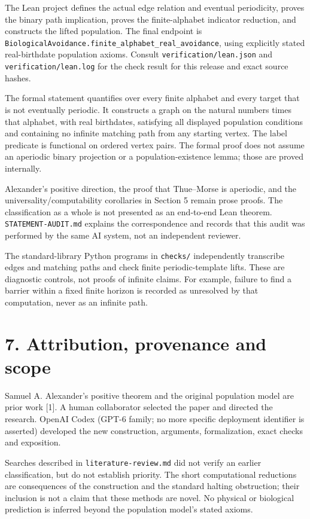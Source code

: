 \documentclass[
  11pt,
]{article}
\begin{document}
The Lean project defines the actual edge relation and eventual
periodicity, proves the binary path implication, proves the
finite-alphabet indicator reduction, and constructs the lifted
population. The final endpoint is
\texttt{BiologicalAvoidance.finite\_alphabet\_real\_avoidance}, using
explicitly stated real-birthdate population axioms. Consult
\texttt{verification/lean.json} and \texttt{verification/lean.log} for
the check result for this release and exact source hashes.

The formal statement quantifies over every finite alphabet and every
target that is not eventually periodic. It constructs a graph on the
natural numbers times that alphabet, with real birthdates, satisfying
all displayed population conditions and containing no infinite matching
path from any starting vertex. The label predicate is functional on
ordered vertex pairs. The formal proof does not assume an aperiodic
binary projection or a population-existence lemma; those are proved
internally.

Alexander's positive direction, the proof that Thue--Morse is aperiodic,
and the universality/computability corollaries in Section 5 remain prose
proofs. The classification as a whole is not presented as an end-to-end
Lean theorem. \texttt{STATEMENT-AUDIT.md} explains the correspondence
and records that this audit was performed by the same AI system, not an
independent reviewer.

The standard-library Python programs in \texttt{checks/} independently
transcribe edges and matching paths and check finite periodic-template
lifts. These are diagnostic controls, not proofs of infinite claims. For
example, failure to find a barrier within a fixed finite horizon is
recorded as unresolved by that computation, never as an infinite path.

\section{7. Attribution, provenance and
scope}\label{attribution-provenance-and-scope}

Samuel A. Alexander's positive theorem and the original population model
are prior work {[}1{]}. A human collaborator selected the paper and
directed the research. OpenAI Codex (GPT-6 family; no more specific
deployment identifier is asserted) developed the new construction,
arguments, formalization, exact checks and exposition.

Searches described in \texttt{literature-review.md} did not verify an
earlier classification, but do not establish priority. The short
computational reductions are consequences of the construction and the
standard halting obstruction; their inclusion is not a claim that these
methods are novel. No physical or biological prediction is inferred
beyond the population model's stated axioms.
\end{document}
